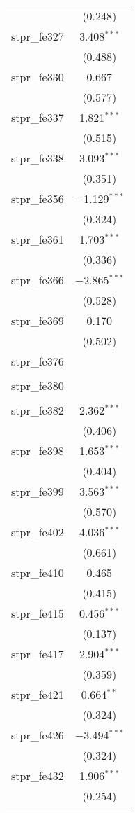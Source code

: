 \begin{table}[!htbp]
\begin{tabular}{@{\extracolsep{5pt}}lc}
  & (0.248) \\ 
  stpr\_fe327 & 3.408$^{***}$ \\ 
  & (0.488) \\ 
  stpr\_fe330 & 0.667 \\ 
  & (0.577) \\ 
  stpr\_fe337 & 1.821$^{***}$ \\ 
  & (0.515) \\ 
  stpr\_fe338 & 3.093$^{***}$ \\ 
  & (0.351) \\ 
  stpr\_fe356 & $-$1.129$^{***}$ \\ 
  & (0.324) \\ 
  stpr\_fe361 & 1.703$^{***}$ \\ 
  & (0.336) \\ 
  stpr\_fe366 & $-$2.865$^{***}$ \\ 
  & (0.528) \\ 
  stpr\_fe369 & 0.170 \\ 
  & (0.502) \\ 
  stpr\_fe376 &  \\ 
  &  \\ 
  stpr\_fe380 &  \\ 
  &  \\ 
  stpr\_fe382 & 2.362$^{***}$ \\ 
  & (0.406) \\ 
  stpr\_fe398 & 1.653$^{***}$ \\ 
  & (0.404) \\ 
  stpr\_fe399 & 3.563$^{***}$ \\ 
  & (0.570) \\ 
  stpr\_fe402 & 4.036$^{***}$ \\ 
  & (0.661) \\ 
  stpr\_fe410 & 0.465 \\ 
  & (0.415) \\ 
  stpr\_fe415 & 0.456$^{***}$ \\ 
  & (0.137) \\ 
  stpr\_fe417 & 2.904$^{***}$ \\ 
  & (0.359) \\ 
  stpr\_fe421 & 0.664$^{**}$ \\ 
  & (0.324) \\ 
  stpr\_fe426 & $-$3.494$^{***}$ \\ 
  & (0.324) \\ 
  stpr\_fe432 & 1.906$^{***}$ \\ 
  & (0.254) \\ 

\end{tabular}
\end{table}
